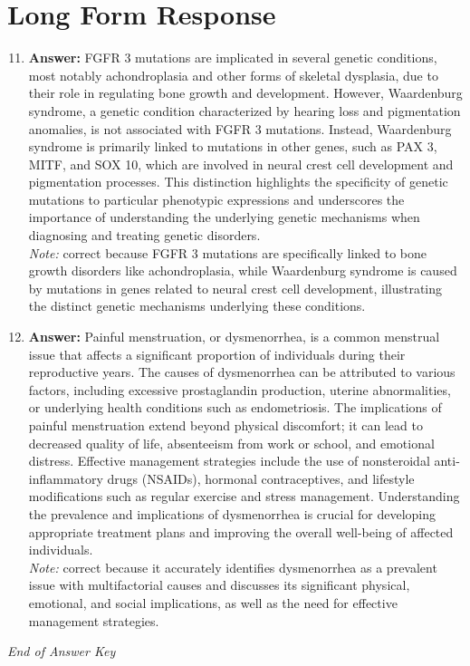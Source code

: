 \documentclass[12pt]{article}
\begin{document}
\section*{Long Form Response}
\begin{enumerate}[label=\arabic*.]
\setcounter{enumi}{10}
\item \textbf{Answer:} FGFR 3 mutations are implicated in several genetic conditions, most notably achondroplasia and other forms of skeletal dysplasia, due to their role in regulating bone growth and development. However, Waardenburg syndrome, a genetic condition characterized by hearing loss and pigmentation anomalies, is not associated with FGFR 3 mutations. Instead, Waardenburg syndrome is primarily linked to mutations in other genes, such as PAX 3, MITF, and SOX 10, which are involved in neural crest cell development and pigmentation processes. This distinction highlights the specificity of genetic mutations to particular phenotypic expressions and underscores the importance of understanding the underlying genetic mechanisms when diagnosing and treating genetic disorders.
\\ \textit{Note:} correct because FGFR 3 mutations are specifically linked to bone growth disorders like achondroplasia, while Waardenburg syndrome is caused by mutations in genes related to neural crest cell development, illustrating the distinct genetic mechanisms underlying these conditions.
\item \textbf{Answer:} Painful menstruation, or dysmenorrhea, is a common menstrual issue that affects a significant proportion of individuals during their reproductive years. The causes of dysmenorrhea can be attributed to various factors, including excessive prostaglandin production, uterine abnormalities, or underlying health conditions such as endometriosis. The implications of painful menstruation extend beyond physical discomfort; it can lead to decreased quality of life, absenteeism from work or school, and emotional distress. Effective management strategies include the use of nonsteroidal anti-inflammatory drugs (NSAIDs), hormonal contraceptives, and lifestyle modifications such as regular exercise and stress management. Understanding the prevalence and implications of dysmenorrhea is crucial for developing appropriate treatment plans and improving the overall well-being of affected individuals.
\\ \textit{Note:} correct because it accurately identifies dysmenorrhea as a prevalent issue with multifactorial causes and discusses its significant physical, emotional, and social implications, as well as the need for effective management strategies.
\end{enumerate}

\vfill
\noindent\textit{End of Answer Key}
\end{document}
